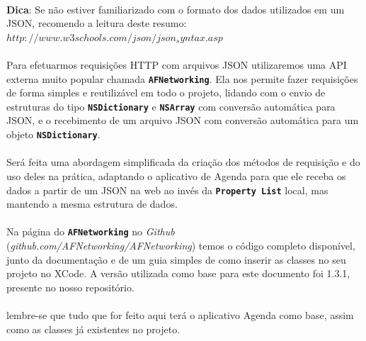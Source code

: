 \documentclass[a4paper,12pt,brazil,doubleside]{book}
\begin{document}
\begin{singlespace}
\bigskip

\begin{framed}
\paragraph{}\textbf{Dica}:  Se não estiver familiarizado com o formato dos dados utilizados em um JSON, recomendo a leitura deste resumo:\\
\(http://www.w3schools.com/json/json_syntax.asp\)

\end{framed}


\paragraph{}Para efetuarmos requisições HTTP com arquivos JSON utilizaremos uma API externa muito popular chamada \texttt{\textbf{AFNetworking}}. Ela nos permite fazer requisições de forma simples e reutilizável em todo o projeto, lidando com o envio de estruturas do tipo \texttt{\textbf{NSDictionary}} e \texttt{\textbf{NSArray}} com conversão automática para JSON, e o recebimento de um arquivo JSON com conversão automática para um objeto \texttt{\textbf{NSDictionary}}.
\paragraph{}Será feita uma abordagem simplificada da criação dos métodos de requisição e do uso deles na prática, adaptando o aplicativo de Agenda para que ele receba os dados a partir de um JSON na web ao invés da \texttt{\textbf{Property List}} local, mas mantendo a mesma estrutura de dados.
\paragraph{}Na página do \texttt{\textbf{AFNetworking}} no \emph{Github} (\textit{github.com/AFNetworking/AFNetworking}) temos o código completo disponível, junto da documentação e de um guia simples de como inserir as classes no seu projeto no XCode. A versão utilizada como base para este documento foi 1.3.1, presente no nosso repositório.
\paragraph{}lembre-se que tudo que for feito aqui terá o aplicativo Agenda como base, assim como as classes já existentes no projeto.

\bigskip


\end{singlespace}
\end{document}
